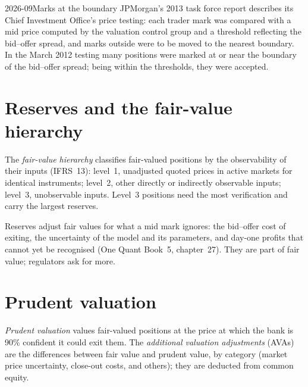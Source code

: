 \begin{dated}{2026-09}{Marks at the boundary}\label{dat:rc:pnl-explain-and-independent-price-verification:cio}
JPMorgan's 2013 task force report describes its Chief Investment Office's price testing: each trader
mark was compared with a mid price computed by the valuation control group and a threshold reflecting
the bid--offer spread, and marks outside were to be moved to the nearest boundary. In the March 2012
testing many positions were marked at or near the boundary of the bid--offer spread; being within the
thresholds, they were accepted.
\end{dated}

\section{Reserves and the fair-value hierarchy}

\begin{definition}\label{def:rc:pnl-explain-and-independent-price-verification:hierarchy}
The \emph{fair-value hierarchy} classifies fair-valued positions by the
observability of their inputs (IFRS~13): level~1, unadjusted quoted prices in active markets for
identical instruments; level~2, other directly or indirectly observable inputs; level~3, unobservable
inputs. Level~3 positions need the
most verification and carry the largest reserves.
\end{definition}

Reserves adjust fair values for what a mid mark ignores: the bid--offer cost of exiting, the
uncertainty of the model and its parameters, and day-one profits that cannot yet be recognised
(One Quant Book~5, chapter~27). They are part of fair value; regulators ask for more.

\section{Prudent valuation}

\begin{definition}\label{def:rc:pnl-explain-and-independent-price-verification:pv}
\emph{Prudent valuation} values fair-valued positions at the price at which
the bank is 90\% confident it could exit them. The \emph{additional valuation
adjustments} (AVAs) are the differences between fair value and
prudent value, by category (market price uncertainty, close-out costs,  and others); they are
deducted from common equity.
\end{definition}

